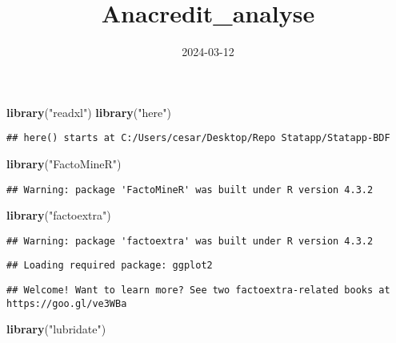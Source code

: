 \documentclass[
]{article}
\title{Anacredit\_analyse}
\author{}
\date{\vspace{-2.5em}2024-03-12}
\newenvironment{Shaded}{\begin{snugshade}}{\end{snugshade}}
\newcommand{\FunctionTok}[1]{\textcolor[rgb]{0.13,0.29,0.53}{\textbf{#1}}}
\newcommand{\NormalTok}[1]{#1}
\newcommand{\StringTok}[1]{\textcolor[rgb]{0.31,0.60,0.02}{#1}}
\begin{document}
\maketitle

\begin{Shaded}
\begin{Highlighting}[]
\FunctionTok{library}\NormalTok{(}\StringTok{"readxl"}\NormalTok{)}
\FunctionTok{library}\NormalTok{(}\StringTok{"here"}\NormalTok{)}
\end{Highlighting}
\end{Shaded}

\begin{verbatim}
## here() starts at C:/Users/cesar/Desktop/Repo Statapp/Statapp-BDF
\end{verbatim}

\begin{Shaded}
\begin{Highlighting}[]
\FunctionTok{library}\NormalTok{(}\StringTok{"FactoMineR"}\NormalTok{)}
\end{Highlighting}
\end{Shaded}

\begin{verbatim}
## Warning: package 'FactoMineR' was built under R version 4.3.2
\end{verbatim}

\begin{Shaded}
\begin{Highlighting}[]
\FunctionTok{library}\NormalTok{(}\StringTok{"factoextra"}\NormalTok{)}
\end{Highlighting}
\end{Shaded}

\begin{verbatim}
## Warning: package 'factoextra' was built under R version 4.3.2
\end{verbatim}

\begin{verbatim}
## Loading required package: ggplot2
\end{verbatim}

\begin{verbatim}
## Welcome! Want to learn more? See two factoextra-related books at https://goo.gl/ve3WBa
\end{verbatim}

\begin{Shaded}
\begin{Highlighting}[]
\FunctionTok{library}\NormalTok{(}\StringTok{"lubridate"}\NormalTok{)}
\end{Highlighting}
\end{Shaded}
\end{document}
